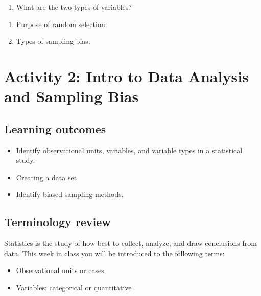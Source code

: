 \documentclass[
]{report}
\providecommand{\tightlist}{%
  \setlength{\itemsep}{0pt}\setlength{\parskip}{0pt}}
\begin{document}
\begin{enumerate}
\def\labelenumi{\arabic{enumi}.}
\tightlist
\item
  What are the two types of variables?
\end{enumerate}

\vspace{0.3in}

\begin{enumerate}
\def\labelenumi{\arabic{enumi}.}
\setcounter{enumi}{1}
\item
  Purpose of random selection:
  \vspace{0.6in}
\item
  Types of sampling bias:
\end{enumerate}

\vspace{0.5in}

\newpage

\section{Activity 2: Intro to Data Analysis and Sampling Bias}\label{activity-2-intro-to-data-analysis-and-sampling-bias}


\subsection{Learning outcomes}\label{learning-outcomes-1}

\begin{itemize}
\item
  Identify observational units, variables, and variable types in a statistical study.
\item
  Creating a data set
\item
  Identify biased sampling methods.
\end{itemize}

\subsection{Terminology review}\label{terminology-review-1}

Statistics is the study of how best to collect, analyze, and draw conclusions from data. This week in class you will be introduced to the following terms:

\begin{itemize}
\item
  Observational units or cases
\item
  Variables: categorical or quantitative
\end{itemize}
\end{document}
